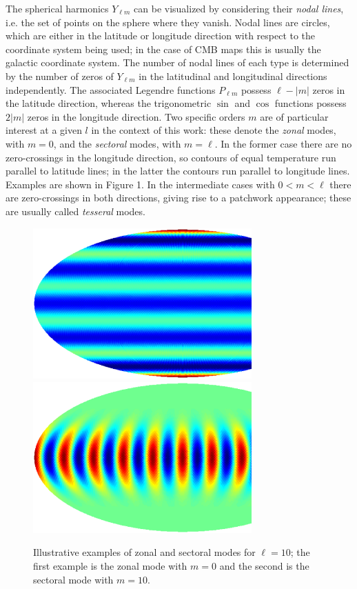 \documentclass[useAMS,usenatbib,usegraphicx]{mn2e}
\def\l{{\ell}}
\def\lm{{\l m}}
\def\ylm{Y_{\lm}}
\begin{document}
The spherical harmonics  $\ylm$ can be visualized by considering
their {\em nodal lines}, i.e. the set of points on the sphere where
they vanish. Nodal lines are circles, which are either in the
latitude or longitude direction with respect to the coordinate
system being used; in the case of CMB maps this is usually the
galactic coordinate system. The number of nodal lines of each type
is determined by the number of zeros of  $\ylm$ in the latitudinal
and longitudinal directions independently. The associated Legendre
functions $P_\lm$ possess $\l-|m|$ zeros in the latitude direction,
whereas the trigonometric $\sin$ and $\cos$ functions possess $2|m|$
zeros in the longitude direction. Two specific orders $m$ are of
particular interest at a given $l$ in the context of this work:
these denote the {\em zonal} modes, with $m=0$, and the {\em
sectoral} modes, with $m=\l$. In the former case there are no
zero-crossings in the longitude direction, so contours of equal
temperature run parallel to latitude lines; in the latter the
contours run parallel to longitude lines. Examples are shown in
Figure 1. In the intermediate cases with $0<m<\l$ there are
zero-crossings in both directions, giving rise to a patchwork
appearance; these are usually called {\em tesseral} modes.
\begin{figure}
  \centering
  \includegraphics[width = 84mm]{mapl10m0.ps}
  \includegraphics[width = 84mm]{mapl10m10.ps}
  \caption{Illustrative examples of zonal and sectoral modes for $\l=10$; the first example is the
  zonal mode with $m=0$ and the second is the sectoral mode with $m=10$.}
  \label{fig1}
\end{figure}
\end{document}
